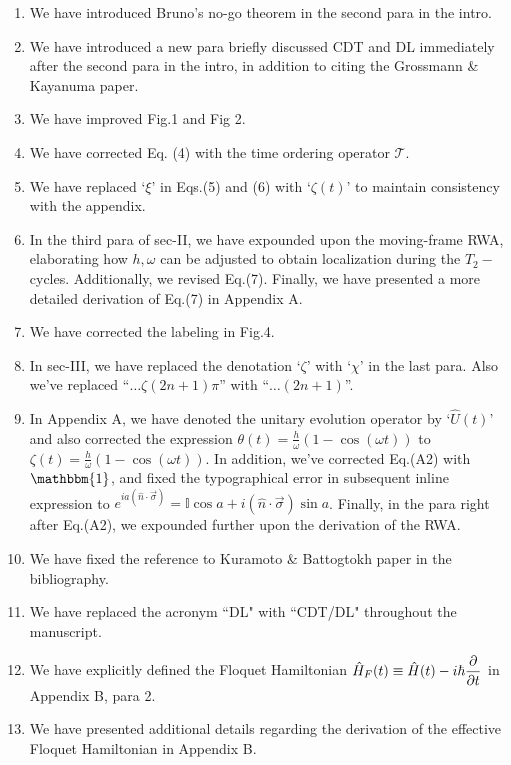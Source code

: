 \documentclass[aps,prb,reprint,showpacs,floatfix,superscriptaddress, onecolumn, nofootinbib, 9pt]{revtex4-2}
\begin{document}
\begin{enumerate}
\item We have introduced Bruno's no-go theorem in the second para in the intro.
\item We have introduced a new para  briefly discussed CDT and DL immediately after the second para in the intro, in addition to citing the Grossmann \& Kayanuma paper. 
\item We have improved Fig.1 and Fig 2.
\item We have corrected Eq. (4) with the time ordering operator $\mathcal{T}$.
\item We have replaced `$\xi$' in Eqs.(5) and (6) with `$\zeta(t)$' to maintain consistency with the  appendix.
\item In the third para of sec-II, we have expounded upon the moving-frame RWA, elaborating how $h,\omega$ can be adjusted to obtain  localization during the $T_2-$cycles. Additionally, we revised Eq.(7). Finally, we have presented a more detailed derivation of Eq.(7) in Appendix A.
\item We have corrected the labeling in Fig.4.
\item In sec-III, we have replaced the denotation `$\zeta$' with `$\chi$'  in the last para. Also we've replaced ``$\dots\zeta(2n+1)\pi$'' with ``$\dots (2n+1)$''.
\item In Appendix A, we have denoted the unitary evolution operator by `$\hat{U}(t)$' and also corrected the expression $\theta(t) = \frac{h}{\omega}(1-\cos(\omega t))$ to $\zeta(t) = \frac{h}{\omega}(1-\cos(\omega t))$. In addition, we've corrected Eq.(A2) with $\mathbbm{1}$, and fixed the typographical error in subsequent inline expression to 
$e^{i a\left(\hat{n} \cdot \vec{\sigma}\right)} = \mathbb{I}\cos{a} + i (\hat{n} \cdot \vec{\sigma}) \sin{a}$. Finally, in the para right after Eq.(A2), we expounded further upon the derivation of the RWA.

\item We have fixed the reference to Kuramoto \& Battogtokh paper in the bibliography.
\item We have replaced the acronym ``DL" with ``CDT/DL" throughout the manuscript.

\item We have explicitly defined the Floquet Hamiltonian $\displaystyle \hat{H}_F(t) \equiv \hat{H}(t) - i\hbar \pdv{t}$ in Appendix B, para 2.

\item We have presented additional details regarding the derivation of the effective Floquet Hamiltonian in Appendix B.
\end{enumerate}


\end{document}
